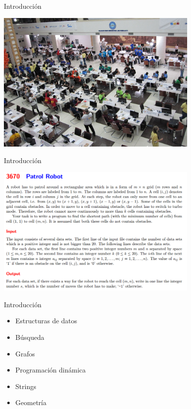 \documentclass[mathserif,handout]{beamer}
\begin{document}
\begin{frame}{Introducción}

\begin{center}
\includegraphics[width=10cm]{icpc-contest}
\end{center}
\end{frame}

\begin{frame}{Introducción}

\begin{center}
\includegraphics[width=10cm]{problema}
\end{center}
\end{frame}

\begin{frame}{Introducción}
  \begin{itemize}
      \item Estructuras de datos\pause
      \item Búsqueda\pause
      \item Grafos\pause
      \item Programación dinámica\pause
      \item Strings\pause
      \item Geometría
\end{itemize}
\end{frame}
\end{document}
